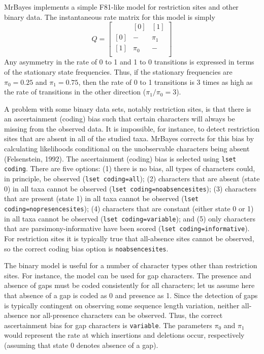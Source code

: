 \documentclass[12pt]{book}
\begin{document}
MrBayes implements a simple F81-like model for restriction sites and other binary data. The
instantaneous rate matrix for this model is simply
\[
Q=\begin{bmatrix}
    & [0] & [1]\\
 [0]& - & \pi_{1}\\
 [1]&  \pi_{0}& - \\
\end{bmatrix}
\]
Any asymmetry in the rate of 0 to 1 and 1 to 0 transitions is expressed in terms of the stationary
state frequencies. Thus, if the stationary frequencies are $\pi_0 = 0.25$ and $\pi_1 = 0.75$, then
the rate of 0 to 1 transitions is 3 times as high as the rate of transitions in the other direction
($\pi_1 / \pi_0 = 3$).

A problem with some binary data sets, notably restriction sites, is that there is an ascertainment
(coding) bias such that certain characters will always be missing from the observed data. It is
impossible, for instance, to detect restriction sites that are absent in all of the studied taxa.
MrBayes corrects for this bias by calculating likelihoods conditional on the unobservable
characters being absent (Felsenstein, 1992). The ascertainment (coding) bias is selected using
\texttt{lset coding}. There are five options: (1) there is no bias, all types of characters could,
in principle, be observed (\texttt{lset coding=all}); (2) characters that are absent (state 0) in
all taxa cannot be observed (\texttt{lset coding=noabsencesites}); (3) characters that are present
(state 1) in all taxa cannot be observed (\texttt{lset coding=nopresencesites}); (4) characters
that are constant (either state 0 or 1) in all taxa cannot be observed (\texttt{lset
coding=variable}); and (5) only characters that are parsimony-informative have been scored
(\texttt{lset coding=informative}).  For restriction sites it is typically true that all-absence
sites cannot be observed, so the correct coding bias option is \texttt{noabsencesites}.

The binary model is useful for a number of character types other than restriction sites. For
instance, the model can be used for gap characters. The presence and absence of gaps must be coded
consistently for all characters; let us assume here that absence of a gap is coded as 0 and
presence as 1. Since the detection of gaps is typically contingent on observing some sequence
length variation, neither all-absence nor all-presence characters can be observed. Thus, the
correct ascertainment bias for gap characters is \texttt{variable}. The parameters $\pi_0$ and
$\pi_1$ would represent the rate at which insertions and deletions occur, respectively (assuming
that state 0 denotes absence of a gap).
\end{document}
